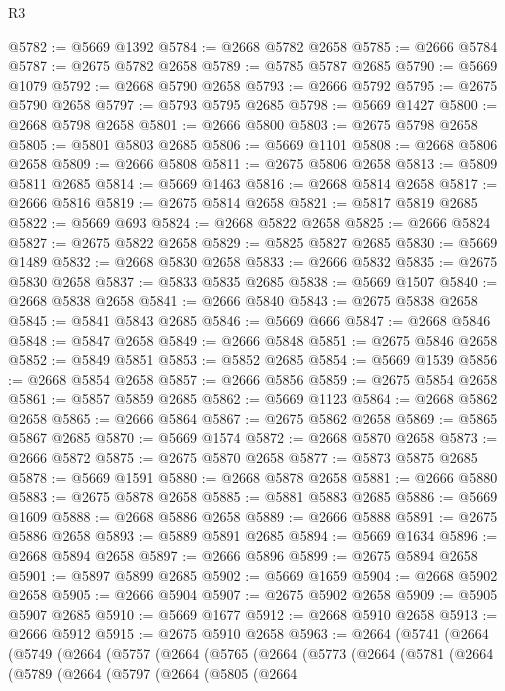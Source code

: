 \begin{lexlean}{R3}
\begin{coremodule}
@5782 := @5669 @1392
@5784 := @2668 @5782 @2658
@5785 := @2666 @5784
@5787 := @2675 @5782 @2658
@5789 := @5785 @5787 @2685
@5790 := @5669 @1079
@5792 := @2668 @5790 @2658
@5793 := @2666 @5792
@5795 := @2675 @5790 @2658
@5797 := @5793 @5795 @2685
@5798 := @5669 @1427
@5800 := @2668 @5798 @2658
@5801 := @2666 @5800
@5803 := @2675 @5798 @2658
@5805 := @5801 @5803 @2685
@5806 := @5669 @1101
@5808 := @2668 @5806 @2658
@5809 := @2666 @5808
@5811 := @2675 @5806 @2658
@5813 := @5809 @5811 @2685
@5814 := @5669 @1463
@5816 := @2668 @5814 @2658
@5817 := @2666 @5816
@5819 := @2675 @5814 @2658
@5821 := @5817 @5819 @2685
@5822 := @5669 @693
@5824 := @2668 @5822 @2658
@5825 := @2666 @5824
@5827 := @2675 @5822 @2658
@5829 := @5825 @5827 @2685
@5830 := @5669 @1489
@5832 := @2668 @5830 @2658
@5833 := @2666 @5832
@5835 := @2675 @5830 @2658
@5837 := @5833 @5835 @2685
@5838 := @5669 @1507
@5840 := @2668 @5838 @2658
@5841 := @2666 @5840
@5843 := @2675 @5838 @2658
@5845 := @5841 @5843 @2685
@5846 := @5669 @666
@5847 := @2668 @5846
@5848 := @5847 @2658
@5849 := @2666 @5848
@5851 := @2675 @5846 @2658
@5852 := @5849 @5851
@5853 := @5852 @2685
@5854 := @5669 @1539
@5856 := @2668 @5854 @2658
@5857 := @2666 @5856
@5859 := @2675 @5854 @2658
@5861 := @5857 @5859 @2685
@5862 := @5669 @1123
@5864 := @2668 @5862 @2658
@5865 := @2666 @5864
@5867 := @2675 @5862 @2658
@5869 := @5865 @5867 @2685
@5870 := @5669 @1574
@5872 := @2668 @5870 @2658
@5873 := @2666 @5872
@5875 := @2675 @5870 @2658
@5877 := @5873 @5875 @2685
@5878 := @5669 @1591
@5880 := @2668 @5878 @2658
@5881 := @2666 @5880
@5883 := @2675 @5878 @2658
@5885 := @5881 @5883 @2685
@5886 := @5669 @1609
@5888 := @2668 @5886 @2658
@5889 := @2666 @5888
@5891 := @2675 @5886 @2658
@5893 := @5889 @5891 @2685
@5894 := @5669 @1634
@5896 := @2668 @5894 @2658
@5897 := @2666 @5896
@5899 := @2675 @5894 @2658
@5901 := @5897 @5899 @2685
@5902 := @5669 @1659
@5904 := @2668 @5902 @2658
@5905 := @2666 @5904
@5907 := @2675 @5902 @2658
@5909 := @5905 @5907 @2685
@5910 := @5669 @1677
@5912 := @2668 @5910 @2658
@5913 := @2666 @5912
@5915 := @2675 @5910 @2658
@5963 := @2664
    (@5741
      (@2664
        (@5749
          (@2664
            (@5757
              (@2664
                (@5765
                  (@2664
                    (@5773
                      (@2664
                        (@5781
                          (@2664
                            (@5789
                              (@2664
                                (@5797
                                  (@2664
                                    (@5805
                                      (@2664

\end{coremodule}
\end{lexlean}
